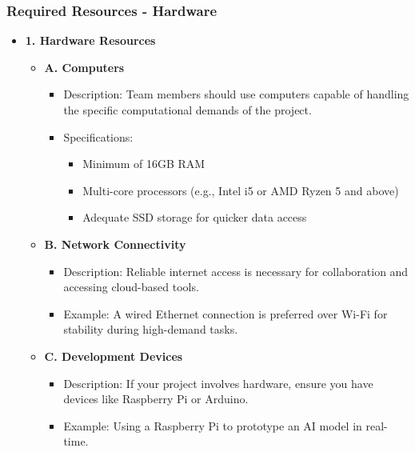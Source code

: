 \documentclass{beamer}
\begin{document}
\begin{frame}[fragile]
    \frametitle{Required Resources - Hardware}
    \begin{itemize}
        \item \textbf{1. Hardware Resources}
        \begin{itemize}
            \item \textbf{A. Computers}
            \begin{itemize}
                \item Description: Team members should use computers capable of handling the specific computational demands of the project.
                \item Specifications:
                \begin{itemize}
                    \item Minimum of 16GB RAM
                    \item Multi-core processors (e.g., Intel i5 or AMD Ryzen 5 and above)
                    \item Adequate SSD storage for quicker data access
                \end{itemize}
            \end{itemize}
            
            \item \textbf{B. Network Connectivity}
            \begin{itemize}
                \item Description: Reliable internet access is necessary for collaboration and accessing cloud-based tools.
                \item Example: A wired Ethernet connection is preferred over Wi-Fi for stability during high-demand tasks.
            \end{itemize}
            
            \item \textbf{C. Development Devices}
            \begin{itemize}
                \item Description: If your project involves hardware, ensure you have devices like Raspberry Pi or Arduino.
                \item Example: Using a Raspberry Pi to prototype an AI model in real-time.
            \end{itemize}
        \end{itemize}
    \end{itemize}
\end{frame}
\end{document}
